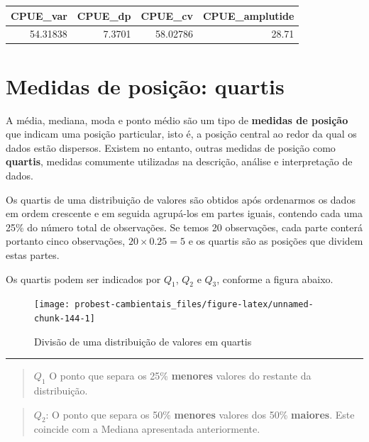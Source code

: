 \documentclass[
]{book}
\begin{document}
\begin{tabular}{r|r|r|r}
\hline
CPUE\_var & CPUE\_dp & CPUE\_cv & CPUE\_amplutide\\
\hline
54.31838 & 7.3701 & 58.02786 & 28.71\\
\hline
\end{tabular}

\hypertarget{quartis}{%
\chapter{Medidas de posição: quartis}\label{quartis}}

A média, mediana, moda e ponto médio são um tipo de \textbf{medidas de posição} que indicam uma posição particular, isto é, a posição central ao redor da qual os dados estão dispersos. Existem no entanto, outras medidas de posição como \textbf{quartis}, medidas comumente utilizadas na descrição, análise e interpretação de dados.

Os quartis de uma distribuição de valores são obtidos após ordenarmos os dados em ordem crescente e em seguida agrupá-los em partes iguais, contendo cada uma 25\% do número total de observações. Se temos 20 observações, cada parte conterá portanto cinco observações, \(20 \times 0.25 = 5\) e os quartis são as posições que dividem estas partes.

Os quartis podem ser indicados por \(Q_1\), \(Q_2\) e \(Q_3\), conforme a figura abaixo.

\begin{figure}

{\centering \texttt{[image: probest-cambientais\_files/figure-latex/unnamed-chunk-144-1]} 

}

\caption{Divisão de uma distribuição de valores em quartis}\label{fig:unnamed-chunk-144}
\end{figure}

\begin{center}\rule{0.5\linewidth}{0.5pt}\end{center}

\begin{quote}
\(Q_{1}\) O ponto que separa os 25\% \textbf{menores} valores do restante da distribuição.
\end{quote}

\begin{quote}
\(Q_{2}\): O ponto que separa os 50\% \textbf{menores} valores dos 50\% \textbf{maiores}. Este coincide com a Mediana apresentada anteriormente.
\end{quote}
\end{document}
